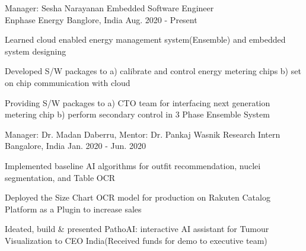 

\begin{cventries}

\cventry
    {Manager: Sesha Narayanan} %
    {Embedded Software Engineer\\  {Enphase Energy}} %
    {Banglore, India} %
    {Aug. 2020 - Present} %
    {
      \begin{cvitems} %
        \item {Learned cloud enabled energy management system(Ensemble) and embedded system designing}
        \item {Developed S/W packages to a) calibrate and control energy metering chips b) set on chip communication with cloud }
        \item {Providing S/W packages to a) CTO team for interfacing next generation metering chip b) perform secondary control in 3 Phase Ensemble System }
      \end{cvitems}
    }
     
    \cventry
    {Manager: Dr. Madan Daberru, Mentor: Dr. Pankaj Wasnik} %
    {Research Intern\\} %
    {Bangalore, India} %
    {Jan. 2020 - Jun. 2020} %
    {
      \begin{cvitems} %
        \item {Implemented baseline AI algorithms for outfit recommendation, nuclei segmentation, and Table OCR}
        \item {Deployed the Size Chart OCR model for production on Rakuten Catalog Platform as a Plugin to increase sales}
        \item {Ideated, build \& presented } PathoAI: interactive AI assistant for Tumour Visualization to CEO India(Received funds for demo to executive team)
     \end{cvitems}
    }


\end{cventries}
